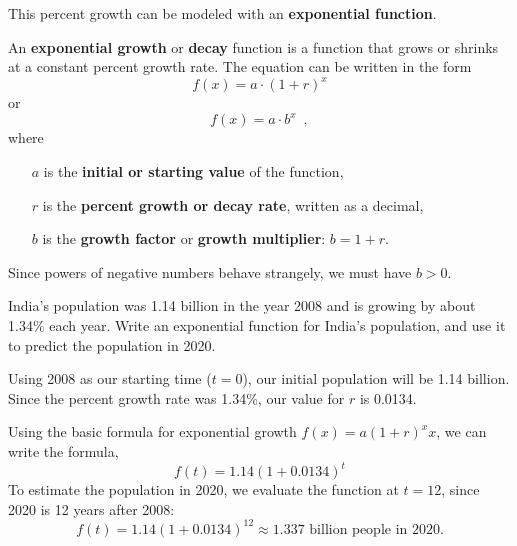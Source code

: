 This percent growth can be modeled with an {\bf exponential function}.

\begin{definition}
An {\bf exponential growth} or {\bf decay} function is a function that grows or shrinks at a constant percent growth rate. The equation can be written in the form
$$f(x) = a\cdot(1+r)^x$$
or
$$f(x)=a\cdot b^x \enspace ,$$
where
\begin{itemize}
  \item[$a$] is the {\bf initial or starting value} of the function,
  \item[$r$] is the {\bf percent growth or decay rate}, written as a decimal,
  \item[$b$] is the {\bf growth factor} or {\bf growth multiplier}: $b=1+r$.
\end{itemize}
Since powers of negative numbers behave strangely, we must have $b>0$.
\end{definition}

\begin{example}
India's population was 1.14 billion in the year 2008 and is growing by about 1.34\% each year. Write an exponential function for India's population, and use it to predict the population in 2020.

\solution Using 2008 as our starting time ($t=0$), our initial population will be 1.14 billion. Since the percent growth rate was 1.34\%, our value for $r$ is 0.0134.

Using the basic formula for exponential growth $f(x)=a(1+r)^xx$, we can write the formula,
$$f(t)=1.14(1+0.0134)^t$$
To estimate the population in 2020, we evaluate the function at $t=12$, since 2020 is 12 years after 2008:
$$f(t)=1.14(1+0.0134)^{12}\approx1.337 \mbox{ billion people in 2020.}$$
\end{example}

